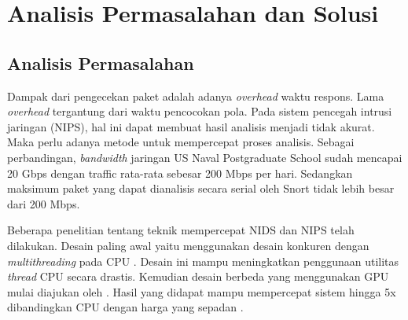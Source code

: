
\chapter{Analisis Permasalahan dan Solusi}


  \section{Analisis Permasalahan}
  


    Dampak dari pengecekan paket adalah adanya \emph{overhead} waktu respons. Lama \emph{overhead} tergantung dari waktu pencocokan pola. Pada sistem pencegah intrusi jaringan (NIPS), hal ini dapat membuat hasil analisis menjadi tidak akurat. Maka perlu adanya metode untuk mempercepat proses analisis. Sebagai perbandingan, \emph{bandwidth} jaringan US Naval Postgraduate School sudah mencapai 20 Gbps dengan traffic rata-rata sebesar 200 Mbps per hari. Sedangkan maksimum paket yang dapat dianalisis secara serial oleh Snort tidak lebih besar dari 200 Mbps.

    Beberapa penelitian tentang teknik mempercepat NIDS dan NIPS telah dilakukan. Desain paling awal yaitu menggunakan desain konkuren dengan \emph{multithreading} pada CPU \citep{multi2004}. Desain ini mampu meningkatkan penggunaan utilitas \emph{thread} CPU secara drastis. Kemudian desain berbeda yang menggunakan GPU mulai diajukan oleh \citep{gnort2008}. Hasil yang didapat mampu mempercepat sistem hingga 5x dibandingkan CPU dengan harga yang sepadan \citep{smith2009}.


